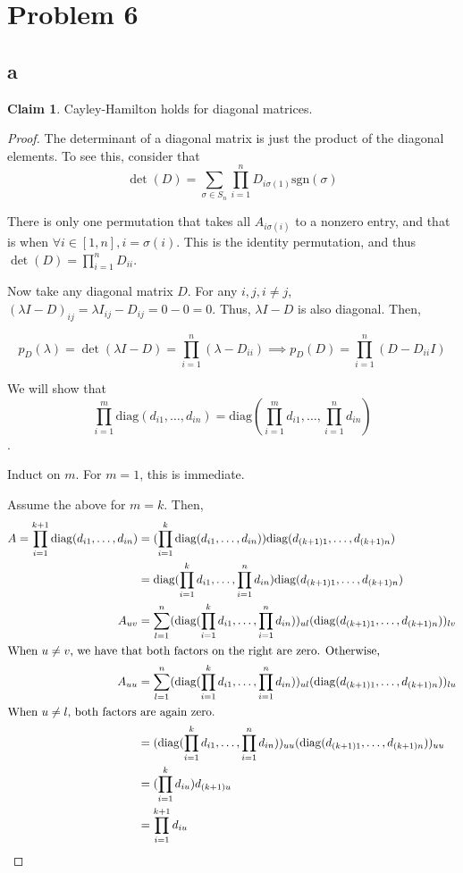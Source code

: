 \documentclass[12pt,letterpaper]{article}
\theoremstyle{definition}
\newtheorem*{claim}{Claim}
\newcommand{\diag}{\mathrm{diag}}
\begin{document}
\section*{Problem 6}

\subsection*{a}

\begin{claim}
  Cayley-Hamilton holds for diagonal matrices.
\end{claim}

\begin{proof}
  The determinant of a diagonal matrix is just the product of the diagonal
  elements. To see this, consider that
  \[
    \det(D) = \sum_{\sigma \in S_n}\prod_{i=1}^nD_{i\sigma(1)}\text{sgn}(\sigma)
  \]

  There is only one permutation that takes all $A_{i\sigma(i)}$ to a nonzero
  entry, and that is when $\forall i \in [1, n], i = \sigma(i)$. This is the
  identity permutation, and thus $\det(D) = \prod_{i=1}^nD_{ii}$.

  Now take any diagonal matrix $D$. For any $i, j, i \neq j$, $(\lambda I -
  D)_{ij} = \lambda I_{ij} - D_{ij} = 0 - 0 = 0$. Thus, $\lambda I - D$ is also
  diagonal. Then,

  \[
    p_D(\lambda) = \det(\lambda I - D) = \prod_{i=1}^n(\lambda - D_{ii})
    \implies p_D(D) = \prod_{i=1}^n(D - D_{ii}I)
  \]

  We will show that
  \[\prod_{i=1}^m\diag(d_{i1}, \dots, d_{in}) =
  \diag(\prod_{i=1}^md_{i1}, \dots, \prod_{i=1}^nd_{in})\].

  Induct on $m$. For $m = 1$, this is immediate.

  Assume the above for $m = k$. Then,
  \begin{align*}
    A = \prod_{i=1}^{k+1}\diag(d_{i1}, \dots, d_{in}) &= (\prod_{i=1}^k\diag(d_{i1},
                                                    \dots, d_{in}))\diag(d_{(k+1)1}, \dots, d_{(k+1)n}) \\
                                                      &= \diag(\prod_{i=1}^kd_{i1}, \dots, \prod_{i=1}^nd_{in})\diag(d_{(k+1)1}, \dots, d_{(k+1)n}) \\
    A_{uv} &= \sum_{l=1}^n(\diag(\prod_{i=1}^kd_{i1}, \dots, \prod_{i=1}^nd_{in}))_{ul}(\diag(d_{(k+1)1}, \dots, d_{(k+1)n}))_{lv} \\
    \intertext{When $u \neq v$, we have that both factors on the right are zero. Otherwise,}
    A_{uu} &= \sum_{l=1}^n(\diag(\prod_{i=1}^kd_{i1}, \dots, \prod_{i=1}^nd_{in}))_{ul}(\diag(d_{(k+1)1}, \dots, d_{(k+1)n}))_{lu} \\
    \intertext{When $u \neq l$, both factors are again zero.}
                                                      &= (\diag(\prod_{i=1}^kd_{i1}, \dots, \prod_{i=1}^nd_{in}))_{uu}(\diag(d_{(k+1)1}, \dots, d_{(k+1)n}))_{uu} \\
                                                      &= (\prod_{i=1}^kd_{iu})d_{(k+1)u} \\
                                                      &= \prod_{i=1}^{k+1}d_{iu}
  \end{align*}


\end{proof}
\end{document}
